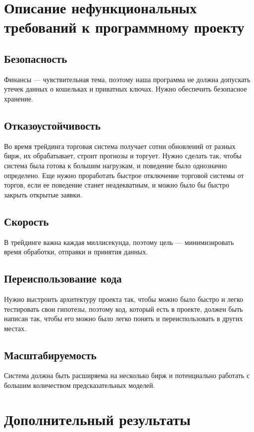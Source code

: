 \documentclass{article}
\begin{document}
\section{Описание нефункциональных требований к программному проекту}

\subsection{Безопасность}
Финансы — чувствительная тема, поэтому наша программа не должна допускать утечек данных о кошельках и приватных ключах. Нужно обеспечить безопасное хранение.

\subsection{Отказоустойчивость}
Во время трейдинга торговая система получает сотни обновлений от разных бирж, их обрабатывает, строит прогнозы и торгует. Нужно сделать так, чтобы система была готова к большим нагрузкам, и поведение было однозначно определено. Еще нужно проработать быстрое отключение торговой системы от торгов, если ее поведение станет неадекватным, и можно было бы быстро закрыть открытые заявки.

\subsection{Скорость}
В трейдинге важна каждая миллисекунда, поэтому цель — минимизировать время обработки, отправки и принятия данных.

\subsection{Переиспользование кода}
Нужно выстроить архитектуру проекта так, чтобы можно было быстро и легко тестировать свои гипотезы, поэтому код, который есть в проекте, должен быть написан так, чтобы его можно было легко понять и переиспользовать в других местах.

\subsection{Масштабируемость}
Система должна быть расширяема на несколько бирж и потенциально работать с большим количеством предсказательных моделей.

\section{Дополнительный результаты}
\end{document}
